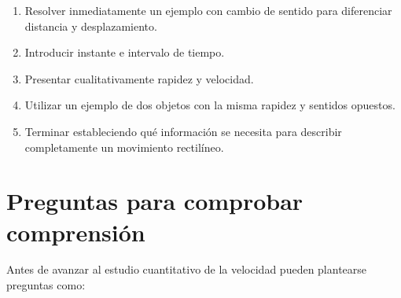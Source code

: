 \begin{notapedagogica}
\begin{enumerate}
    \item Resolver inmediatamente un ejemplo con cambio de sentido para
    diferenciar distancia y desplazamiento.

    \item Introducir instante e intervalo de tiempo.

    \item Presentar cualitativamente rapidez y velocidad.

    \item Utilizar un ejemplo de dos objetos con la misma rapidez y sentidos
    opuestos.

    \item Terminar estableciendo qué información se necesita para describir
    completamente un movimiento rectilíneo.

\end{enumerate}
\end{notapedagogica}


\section{Preguntas para comprobar comprensión}

Antes de avanzar al estudio cuantitativo de la velocidad pueden plantearse
preguntas como:

